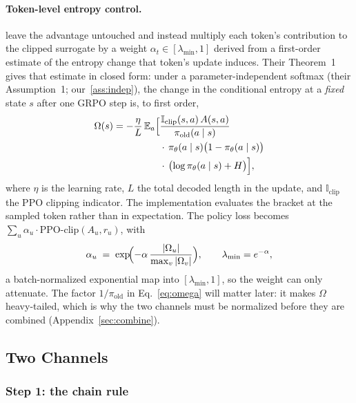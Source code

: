 \documentclass[11pt]{article}
\newcommand{\Om}{\Omega}
\newcommand{\E}{\mathbb{E}}
\newcommand{\pit}{\pi_{\theta}}
\begin{document}
\paragraph{Token-level entropy control.}
\citet{steer} leave the advantage untouched and instead multiply each token's
contribution to the clipped surrogate by a weight
$\alpha_t \in [\lambda_{\min}, 1]$ derived from a first-order estimate of the
entropy change that token's update induces. Their Theorem~1 gives that estimate in
closed form: under a parameter-independent softmax
(their Assumption~1; our~\ref{ass:indep}), the change in the conditional entropy at
a \emph{fixed} state $s$ after one GRPO step is, to first order,
%
\begin{equation}
\begin{split}
\Om(s) = -\frac{\eta}{L}\, \E_{a}\Bigl[
  &\frac{\mathbb{I}_{\mathrm{clip}}(s,a)\, A(s,a)}{\pi_{\mathrm{old}}(a \mid s)}\\
  &\cdot\, \pit(a \mid s)\bigl(1 - \pit(a \mid s)\bigr)\\
  &\cdot\, \bigl(\log \pit(a \mid s) + H\bigr)\Bigr],
\end{split}
\label{eq:omega-app}
\end{equation}
%
where $\eta$ is the learning rate, $L$ the total decoded length in the update, and
$\mathbb{I}_{\mathrm{clip}}$ the PPO clipping indicator. The implementation
evaluates the bracket at the sampled token rather than in expectation. The policy
loss becomes $\sum_u \alpha_u \cdot \mathrm{PPO\text{-}clip}(A_u, r_u)$, with
%
\begin{equation}
\alpha_u \;=\; \exp\!\Bigl(-\alpha\, \frac{|\Om_u|}{\max_v |\Om_v|}\Bigr),
\qquad \lambda_{\min} = e^{-\alpha},
\label{eq:steermap}
\end{equation}
%
a batch-normalized exponential map into $[\lambda_{\min}, 1]$, so the weight can
only attenuate. The factor $1/\pi_{\mathrm{old}}$ in Eq.~\eqref{eq:omega} will
matter later: it makes $\Om$ heavy-tailed, which is why the two channels must be
normalized before they are combined (Appendix~\ref{sec:combine}).

\subsection{Two Channels}
\label{sec:channels-app}

\subsubsection{Step 1: the chain rule}
\end{document}
